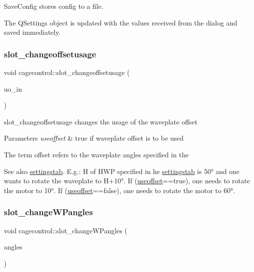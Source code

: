 Save\+Config stores config to a file. 

The Q\+Settings object is updated with the values received from the dialog and saved immediately. \mbox{\label{classcagecontrol_a2e106a12191172da2780a3d7fe137041}} 
\subsubsection{\texorpdfstring{slot\+\_\+changeoffsetusage}{slot\_changeoffsetusage}}
{\footnotesize\ttfamily void cagecontrol\+::slot\+\_\+changeoffsetusage (\begin{DoxyParamCaption}\item[{bool}]{uo\+\_\+in }\end{DoxyParamCaption})\hspace{0.3cm}{\ttfamily [slot]}}



slot\+\_\+changeoffsetusage changes the usage of the waveplate offset 


\begin{DoxyParams}{Parameters}
{\em useoffset} & true if waveplate offset is to be used\\
\hline
\end{DoxyParams}
The term \textquotesingle{}offset\textquotesingle{} refers to the waveplate angles specified in the \begin{DoxySeeAlso}{See also}
\hyperlink{classcagecontrol_a5350ebcf40a0c709af82276e6ce2284d}{settingstab}. E.\+g.\+: \textquotesingle{}H\textquotesingle{} of H\+WP specified in he \hyperlink{classcagecontrol_a5350ebcf40a0c709af82276e6ce2284d}{settingstab} is 50° and one wants to rotate the waveplate to H+10°. If (\hyperlink{classcagecontrol_aaae4d96e61ebe50baf65014003208ac0}{useoffset}==true), one needs to rotate the motor to 10°. If (\hyperlink{classcagecontrol_aaae4d96e61ebe50baf65014003208ac0}{useoffset}==false), one needs to rotate the motor to 60°. 
\end{DoxySeeAlso}
\mbox{\label{classcagecontrol_a27d63224f95901dbbe8560cd88c90bca}} 
\subsubsection{\texorpdfstring{slot\+\_\+change\+W\+Pangles}{slot\_changeWPangles}}
{\footnotesize\ttfamily void cagecontrol\+::slot\+\_\+change\+W\+Pangles (\begin{DoxyParamCaption}\item[{Q\+Vector$<$ double $>$}]{angles }\end{DoxyParamCaption})\hspace{0.3cm}{\ttfamily [slot]}}



